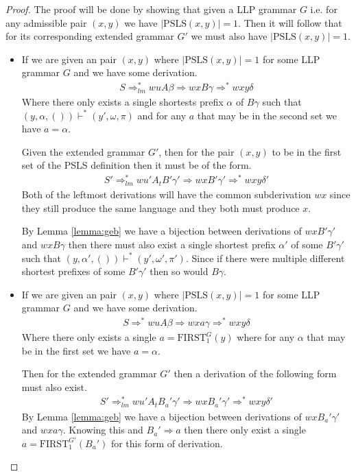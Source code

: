 \documentclass[a4paper,12pt]{article}
\newcommand\PSLS{\text{PSLS}}
\theoremstyle{definition}
\begin{document}
\begin{proof}
  The proof will be done by showing that given a LLP grammar $G$ i.e. for any admissible pair $(x, y)$ we have $|\PSLS(x, y)| = 1$. Then it will follow that for its corresponding extended grammar $G'$ we must also have $|\PSLS(x, y)| = 1$.
  \begin{itemize}
    \item If we are given an pair $(x, y)$ where $|\PSLS(x, y)| = 1$ for some LLP grammar $G$ and we have some derivation.
    \begin{align*}
      S \Rightarrow^*_{lm} wuA\beta \Rightarrow wxB\gamma \Rightarrow^* wxy\delta
    \end{align*}
    Where there only exists a single shortests prefix $\alpha$ of $B\gamma$ such that $(y, \alpha, ()) \vdash^* (y', \omega, \pi)$ and for any $a$ that may be in the second set we have $a = \alpha$. 
  
    Given the extended grammar $G'$, then for the pair $(x, y)$ to be in the first set of the PSLS definition then it must be of the form.
    \begin{align*}
      S' \Rightarrow^*_{lm} wu'A_tB'\gamma' \Rightarrow wxB'\gamma' \Rightarrow^* wxy\delta'
    \end{align*}
    Both of the leftmost derivations will have the common subderivation $wx$ since they still produce the same language and they both must produce $x$. 
  
    By Lemma \ref{lemma:geb} we have a bijection between derivations of $wxB'\gamma'$ and $wxB\gamma$ then there must also exist a single shortest prefix $\alpha'$ of some $B'\gamma'$ such that $(y, \alpha', ()) \vdash^* (y', \omega', \pi')$. Since if there were multiple different shortest prefixes of some $B'\gamma'$ then so would $B\gamma$.
    
    \item If we are given an pair $(x, y)$ where $|\PSLS(x, y)| = 1$ for some LLP grammar $G$ and we have some derivation.
    \begin{align*}
      S \Rightarrow^* wuA\beta \Rightarrow wxa\gamma \Rightarrow^* wxy\delta
    \end{align*}
    Where there only exists a single $a = \text{FIRST}^G_1(y)$ where for any $\alpha$ that may be in the first set we have $a = \alpha$.
  
    Then for the extended grammar $G'$ then a derivation of the following form must also exist.
    \begin{align*}
      S' \Rightarrow^*_{lm} wu'A_tB_a'\gamma' \Rightarrow wxB_a'\gamma' \Rightarrow^* wxy\delta'
    \end{align*}
    By Lemma \ref{lemma:geb} we have a bijection between derivations of $wxB_a'\gamma'$ and $wxa\gamma$. Knowing this and $B_a' \Rightarrow a$ then there only exist a single $a = \text{FIRST}^{G'}_1(B_a')$ for this form of derivation.
    

\end{itemize}
\end{proof}
\end{document}
